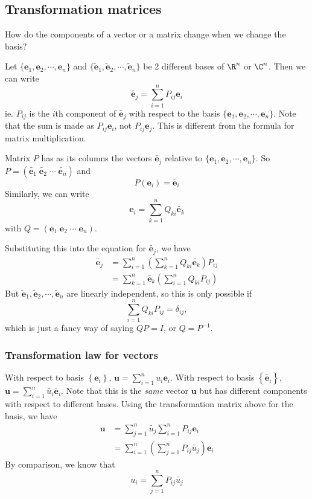 \documentclass[a4paper]{article}
\begin{document}
\subsection{Transformation matrices}
How do the components of a vector or a matrix change when we change the basis?

Let $\{\mathbf{e}_1, \mathbf{e}_2, \cdots, \mathbf{e}_n\}$ and $\{\tilde{\mathbf{e}}_1, \tilde{\mathbf{e}}_2,\cdots, \tilde{\mathbf{e}}_n\}$ be 2 different bases of $\R^n$ or $\C^n$. Then we can write
\[
  \tilde{\mathbf{e}_j} = \sum_{i = 1}^n P_{ij}\mathbf{e}_i
\]
ie. $P_{ij}$ is the $i$th component of $\tilde{\mathbf{e}_j}$ with respect to the basis $\{\mathbf{e}_1, \mathbf{e}_2, \cdots, \mathbf{e}_n\}$. Note that the sum is made as $P_{ij}\mathbf{e}_i$, not $P_{ij}\mathbf{e}_j$. This is different from the formula for matrix multiplication.

Matrix $P$ has as its columns the vectors $\tilde{\mathbf{e}_j}$ relative to $\{\mathbf{e}_1, \mathbf{e}_2, \cdots, \mathbf{e}_n\}$. So $P = (\tilde{\mathbf{e}_1}\; \tilde{\mathbf{e}_2}\; \cdots \; \tilde{\mathbf{e}_n})$ and
\[
  P(\mathbf{e}_i) = \tilde{\mathbf{e}_i}
\]
Similarly, we can write
\[
  \mathbf{e}_i = \sum_{k = 1}^nQ_{ki} \tilde{\mathbf{e}_k}
\]
with $Q = (\mathbf{e}_1\; \mathbf{e}_2\;\cdots\;\mathbf{e}_n)$.

Substituting this into the equation for $\tilde{\mathbf{e}_j}$, we have
\begin{align*}
  \tilde{\mathbf{e}_j} &= \sum_{i = 1}^n\left(\sum_{k = 1}^{n} Q_{ki}\tilde{\mathbf{e}_k}\right)P_{ij}\\
  &= \sum_{k = 1}^n \tilde{\mathbf{e}_k} \left(\sum_{i = 1}^n Q_{ki}P_{ij}\right)
\end{align*}
But $\tilde{\mathbf{e}}_1, \tilde{\mathbf{e}}_2,\cdots, \tilde{\mathbf{e}}_n$ are linearly independent, so this is only possible if
\[
  \sum_{i = 1}^n Q_{ki}P_{ij} = \delta_{ij},
\]
which is just a fancy way of saying $QP = I$, or $Q = P^{-1}$.
\subsubsection{Transformation law for vectors}
With respect to basis $\left\{\mathbf{e}_i\right\}$, $\mathbf{u} = \sum_{i = 1}^n u_i\mathbf{e}_i$.
With respect to basis $\left\{\tilde{\mathbf{e}_i}\right\}$, $\mathbf{u} = \sum_{i = 1}^n \tilde{u_i}\tilde{\mathbf{e}_i}$. Note that this is the \emph{same} vector $\mathbf{u}$ but has different components with respect to different bases. Using the transformation matrix above for the basis, we have
\begin{align*}
  \mathbf{u} &= \sum_{j= 1}^n \tilde{u_j} \sum_{i = 1}^{n}P_{ij}\mathbf{e}_i\\
  &= \sum_{i = 1}^n \left(\sum_{j = 1}^n P_{ij}\tilde{u_j}\right) \mathbf{e}_i
\end{align*}
By comparison, we know that
\[
  u_i = \sum_{j = 1}^n P_{ij}\tilde{u_j}
\]
\end{document}
